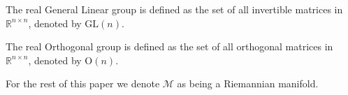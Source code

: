\begin{definition}\label{def:quotient_space}
    
\end{definition}

\begin{definition}\label{def:general_linear_group}
    The \textup{real General Linear group} is defined as the set of all invertible matrices in $\mathbb{R}^{n\times n}$, denoted by $\mathrm{GL}(n)$. \cite[Example~9.11]{Boumal2023}
\end{definition}

\begin{definition}\label{def:orthogonal_group}
    The \textup{real Orthogonal group} is defined as the set of all orthogonal matrices in $\mathbb{R}^{n\times n}$, denoted by $\mathrm{O}(n)$. \cite[p.~3]{Edelman1998}
\end{definition}
    



For the rest of this paper we denote $\mathcal{M}$ as being a Riemannian manifold.










